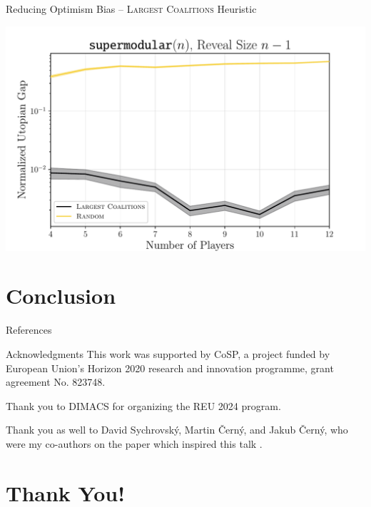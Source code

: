 \documentclass[aspectratio=169]{beamer}
\begin{document}
\begin{frame}{Reducing Optimism Bias -- \textsc{Largest Coalitions} Heuristic}
	\begin{center}
		\includegraphics[width=.8\textwidth]{figures/convex_linear.pdf}
	\end{center}
\end{frame}

\section{Conclusion}

\begin{frame}[allowframebreaks]{References}
    \nocite{*}
    \printbibliography[heading=none]
\end{frame}

\begin{frame}{Acknowledgments}
	This work was supported by CoSP, a project funded by European Union’s Horizon
	2020 research and innovation programme, grant agreement No. 823748.

	Thank you to DIMACS for organizing the REU 2024 program.

	Thank you as well to David Sychrovský, Martin Černý, and Jakub Černý, who
	were my co-authors on the paper which inspired this talk \citep{uradnik2024reducing}.
\end{frame}

\section{Thank You!}
\end{document}
